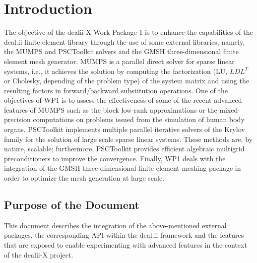 \documentclass[a4paper,12pt]{article}
\begin{document}
\vspace*{2cm}

\disclaimer

\newpage

\tableofcontents %

\newpage

\section{{Introduction}}

The objective of the dealii-X Work Package 1 is to enhance the
capabilities of the deal.ii finite element library through the use of
some external libraries, namely, the MUMPS and PSCToolkit solvers and
the GMSH three-dimensional finite element mesh generator. MUMPS is a
parallel direct solver for sparse linear systems, i.e., it achieves
the solution by computing the factorization (LU, $LDL^T$ or Cholesky,
depending of the problem type) of the system matrix and using the
resulting factors in forward/backward substitution operations. One of
the objectives of WP1 is to assess the effectiveness of some of the
recent advanced features of MUMPS such as the block low-rank
approximations or the mixed-precision computations on problems issued
from the simulation of human body organs. PSCToolkit implements
multiple parallel iterative solvers of the Krylov family for the
solution of large scale sparse linear systems. These methods are, by
nature, scalable; furthermore, PSCToolkit provides efficient algebraic
multigrid preconditioners to improve the convergence. Finally, WP1
deals with the integration of the GMSH three-dimensional finite
element meshing package in order to optimize the mesh generation at
large scale.

\subsection{{Purpose of the Document}}
This document describes the integration of the above-mentioned
external packages, the corresponding API within the deal.ii framework
and the features that are exposed to enable experimenting with
advanced features in the context of the dealii-X project.

\end{document}
